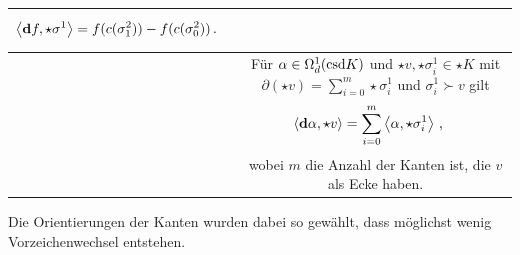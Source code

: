 \begin{bemerkung}
\begin{tabular}{|c|c|}
\begin{minipage}[c]{0.69\textwidth}
        {\begin{align}
          \left\langle \mathbf{d} f , \star\sigma^{1} \right\rangle &= f(c(\sigma^{2}_{1})) - f(c(\sigma^{2}_{0})) \,\text{.}
        \end{align}}
      \end{minipage} \\\hline
      \begin{minipage}[c]{0.30\textwidth}
        \centering
      \end{minipage} &
      \begin{minipage}[c]{0.68\textwidth}
        Für \( \alpha\in\Omega_{d}^{1}(\text{csd} K) \) und \( \star v, \star\sigma_{i}^{1} \in \star K \) mit
        \( \partial(\star v) = \sum_{i=0}^{m} \star\sigma_{i}^{1} \) und \( \sigma_{i}^{1} \succ v  \) gilt
        {\begin{align}
          \left\langle \mathbf{d} \alpha , \star v \right\rangle &=  \sum_{i=0}^{m} \left\langle \alpha, \star\sigma_{i}^{1}\right\rangle
          \,\text{,}
        \end{align}}
        wobei \( m \) die Anzahl der Kanten ist, die \( v \) als Ecke haben.
      \end{minipage} \\\hline
    \end{tabular}
    Die Orientierungen der Kanten wurden dabei so gewählt, dass möglichst wenig Vorzeichenwechsel entstehen.
  \end{bemerkung}

